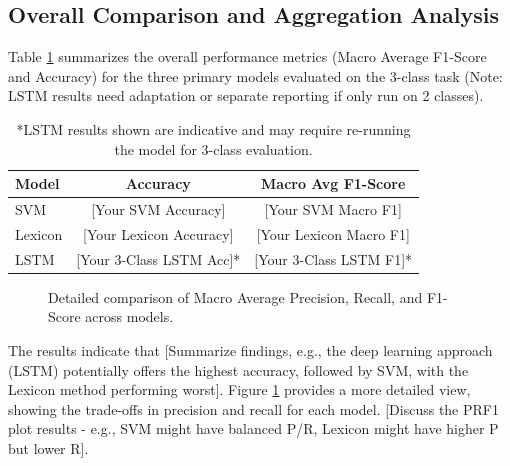 \documentclass[10pt,twocolumn]{article}
\begin{document}
\subsection{Overall Comparison and Aggregation Analysis}
\label{subsec:exp_comparison} %

Table \ref{tab:comparison} summarizes the overall performance metrics (Macro Average F1-Score and Accuracy) for the three primary models evaluated on the 3-class task (Note: LSTM results need adaptation or separate reporting if only run on 2 classes).

\begin{table}[H]
\centering
\caption{Overall Performance Comparison (3-Class Evaluation)}
\label{tab:comparison}
\begin{tabular}{@{}lcc@{}}
\toprule
\textbf{Model} & \textbf{Accuracy} & \textbf{Macro Avg F1-Score} \\
\midrule
SVM        & [Your SVM Accuracy] & [Your SVM Macro F1] \\ %
Lexicon    & [Your Lexicon Accuracy] & [Your Lexicon Macro F1] \\ %
LSTM       & [Your 3-Class LSTM Acc]* & [Your 3-Class LSTM F1]* \\ %
\bottomrule
\end{tabular}
\caption*{\footnotesize{*LSTM results shown are indicative and may require re-running the model for 3-class evaluation.}}
\end{table}

\begin{figure}[H]
    \centering
    \caption{Detailed comparison of Macro Average Precision, Recall, and F1-Score across models.}
    \label{fig:prf1_comparison}
\end{figure}

The results indicate that [Summarize findings, e.g., the deep learning approach (LSTM) potentially offers the highest accuracy, followed by SVM, with the Lexicon method performing worst]. Figure \ref{fig:prf1_comparison} provides a more detailed view, showing the trade-offs in precision and recall for each model. [Discuss the PRF1 plot results - e.g., SVM might have balanced P/R, Lexicon might have higher P but lower R].
\end{document}
